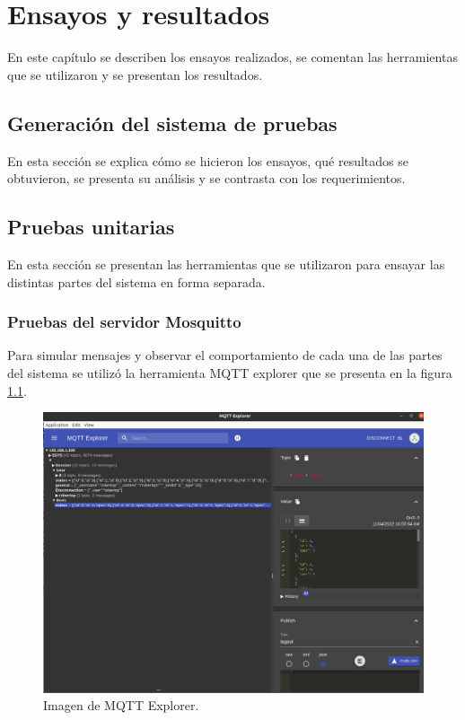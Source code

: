 
\chapter{Ensayos y resultados} %

En este capítulo se describen los ensayos realizados, se comentan las herramientas que se utilizaron y se presentan los resultados.

\label{Chapter4} %


\section{Generación del sistema de pruebas}
\label{sec:pruebasHW}

En esta sección se explica cómo se hicieron los ensayos, qué resultados se obtuvieron, se presenta su análisis y se contrasta con los requerimientos.

\section{Pruebas unitarias}
En esta sección se presentan las herramientas que se utilizaron para ensayar las distintas partes del sistema en forma separada.

\subsection{Pruebas del servidor Mosquitto}
Para simular mensajes y observar el comportamiento de cada una de las partes del sistema se utilizó la herramienta MQTT explorer   \citep{WEBSITE:29} que se presenta en la figura \ref{fig:MQTT Explorer}.

\begin{figure}[ht]
	\centering
	\includegraphics[scale=.30]{./Figures/mqtt-explorer.png}
	\caption{Imagen de MQTT Explorer.}
	\label{fig:MQTT Explorer}
\end{figure}

